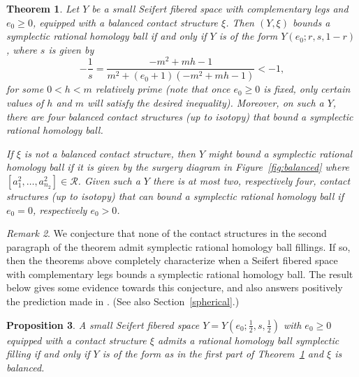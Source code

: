 \documentclass[11pt]{amsart}
\theoremstyle{plain}
\newtheorem{theorem}{Theorem}
\newtheorem{proposition}[theorem]{Proposition}
\theoremstyle{definition}
\theoremstyle{remark}
\newtheorem{remark}[theorem]{Remark}
\numberwithin{theorem}{section}
\begin{document}
\begin{theorem}  \label{thm: nonneg}  
Let $Y$ be a small Seifert fibered space with complementary legs and $e_0\geq 0$, equipped with a balanced contact structure $\xi$. Then $(Y, \xi)$  bounds a symplectic rational homology ball if and only if $Y$ is of the form $Y(e_0;r, s, 1-r)$, where $s$ is given by 
\[
-\dfrac{1}{s}=\frac{-m^2+mh-1}{m^2+(e_0+1)(-m^2+mh-1)}<-1,
\]
for some $0<h<m$ relatively prime (note that once $e_0 \geq 0$ is fixed, only certain values  of $h$ and $m$ will satisfy the desired inequality). Moreover, on such a $Y$, there are four balanced contact structures (up to isotopy) that bound a symplectic rational homology ball. 

If $\xi$ is not a balanced contact structure, then $Y$ might bound a symplectic rational homology ball if it is given by the surgery diagram in Figure~\ref{fig:balanced} where $[a^2_1,\ldots, a^2_{n_2}]\in \mathcal{R}$. Given such a $Y$ there is at most two, respectively four, contact structures (up to isotopy) that can bound a symplectic rational homology ball if $e_0=0$, respectively $e_0>0$. 
\end{theorem}
\begin{remark}
We conjecture that none of the contact structures in the second paragraph of the theorem admit symplectic rational homology ball fillings. If so, then the theorems above completely characterize when a Seifert fibered space with complementary legs bounds a symplectic rational homology ball. The result below gives some evidence towards this conjecture, and also answers positively the prediction made in \cite[Remark~$1.21$]{EtnyreOzbagciTosun2025}. (See also Section~\ref{spherical}.)
\end{remark}


\begin{proposition}\label{dihedO}
A small  Seifert fibered space $Y=Y(e_0; \frac{1}{2}, s, \frac{1}{2})$ with $e_0\geq 0$ equipped with a contact structure $\xi$ admits a rational homology ball symplectic filling if and only if $Y$ is of the form as in the first part of Theorem~\ref{thm: nonneg} and $\xi$ is balanced.
\end{proposition}
\end{document}
